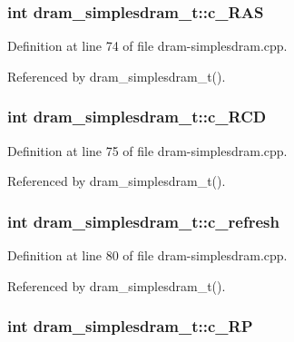 \subsubsection[{c\_\-RAS}]{\setlength{\rightskip}{0pt plus 5cm}int {\bf dram\_\-simplesdram\_\-t::c\_\-RAS}\hspace{0.3cm}{\tt  [protected]}}\label{classdram__simplesdram__t_e4c42ee1ee9ab08a9e5858bd49e27f2f}




Definition at line 74 of file dram-simplesdram.cpp.

Referenced by dram\_\-simplesdram\_\-t().
\subsubsection[{c\_\-RCD}]{\setlength{\rightskip}{0pt plus 5cm}int {\bf dram\_\-simplesdram\_\-t::c\_\-RCD}\hspace{0.3cm}{\tt  [protected]}}\label{classdram__simplesdram__t_5c55079a4ca6c021ade5ae1546df155e}




Definition at line 75 of file dram-simplesdram.cpp.

Referenced by dram\_\-simplesdram\_\-t().
\subsubsection[{c\_\-refresh}]{\setlength{\rightskip}{0pt plus 5cm}int {\bf dram\_\-simplesdram\_\-t::c\_\-refresh}\hspace{0.3cm}{\tt  [protected]}}\label{classdram__simplesdram__t_bd2bcb47aaa1b69e81eb159d720e7923}




Definition at line 80 of file dram-simplesdram.cpp.

Referenced by dram\_\-simplesdram\_\-t().
\subsubsection[{c\_\-RP}]{\setlength{\rightskip}{0pt plus 5cm}int {\bf dram\_\-simplesdram\_\-t::c\_\-RP}\hspace{0.3cm}{\tt  [protected]}}\label{classdram__simplesdram__t_769026f7739e8fff88b797bc2922bdf9}




